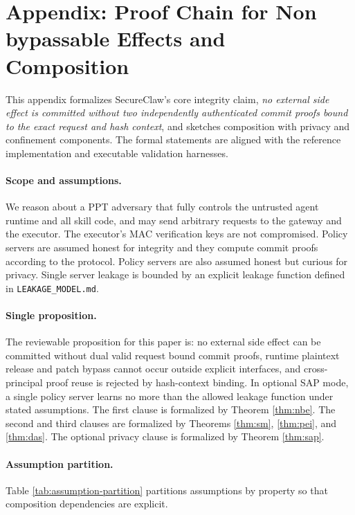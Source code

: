 %

\section{Appendix: Proof Chain for Non bypassable Effects and Composition}
\label{app:proofs}

This appendix formalizes SecureClaw's core integrity claim, \emph{no external side effect is
committed without two independently authenticated commit proofs bound to the exact request and hash
context}, and sketches composition with privacy and confinement components.
The formal statements are aligned with the reference implementation and executable validation harnesses.

\paragraph{Scope and assumptions.}
We reason about a PPT adversary that fully controls the untrusted agent runtime and all skill code,
and may send arbitrary requests to the gateway and the executor. The executor's MAC verification keys
are not compromised.
Policy servers are assumed honest for integrity and they compute commit proofs according to the
protocol.
Policy servers are also assumed honest but curious for privacy.
Single server leakage is bounded by an explicit leakage function defined in \texttt{LEAKAGE\_MODEL.md}.

\paragraph{Single proposition.}
The reviewable proposition for this paper is:
no external side effect can be committed without dual valid request bound commit proofs, runtime
plaintext release and patch bypass cannot occur outside explicit interfaces, and cross-principal proof
reuse is rejected by hash-context binding.
In optional SAP mode, a single policy server learns no more than the allowed leakage function under
stated assumptions.
The first clause is formalized by Theorem \ref{thm:nbe}.
The second and third clauses are formalized by Theorems \ref{thm:sm}, \ref{thm:pei}, and \ref{thm:das}.
The optional privacy clause is formalized by Theorem \ref{thm:sap}.

\paragraph{Assumption partition.}
Table \ref{tab:assumption-partition} partitions assumptions by property so that composition dependencies are explicit.

